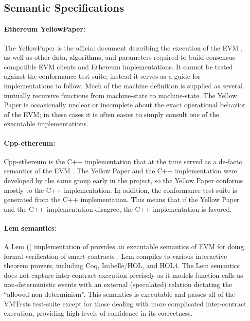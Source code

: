 \subsection{Semantic Specifications}

\paragraph{Ethereum YellowPaper:}
The YellowPaper is the official document describing the execution of the EVM
\cite{WoodReport14},
    as well as other data, algorithms,
    and parameters required to build consensus-compatible
    EVM clients and Ethereum implementations.
It cannot be tested against the conformance test-suite;
instead it serves as a guide for implementations to follow.
Much of the machine definition is supplied as several mutually
recursive functions from machine-state to machine-state.
The Yellow Paper is occasionally unclear or incomplete about
the exact operational behavior of the EVM;
in these cases it is often easier to simply consult one of the executable implementations.

\paragraph{Cpp-ethereum:}
Cpp-ethereum is the
C++ implementation that at the time served as a de-facto semantics of the EVM
\cite{CppEthereumUrl}.
The Yellow Paper and the C++ implementation were
developed by the same group early in the project,
          so the Yellow Paper conforms mostly to the C++ implementation.
In addition, the conformance test-suite is generated from the C++ implementation.
This means that if the Yellow Paper and the C++ implementation disagree,
     the C++ implementation is favored.

\paragraph{Lem semantics:}
A Lem (\cite{MulliganSIGPLAN14}) implementation of \EVM{} provides
an executable semantics of EVM for doing formal verification of smart contracts \cite{HiraiWSTC17}.
Lem compiles to various interactive theorem provers,
    including Coq, Isabelle/HOL, and HOL4.
The Lem semantics does not capture inter-contract
execution precisely as it models function calls as non-deterministic events with an external (speculated) relation dictating the ``allowed non-determinism''.
This semantics is executable and passes all of the VMTests
test-suite except for those dealing with more complicated inter-contract execution,
  providing high levels of confidence in its correctness.

